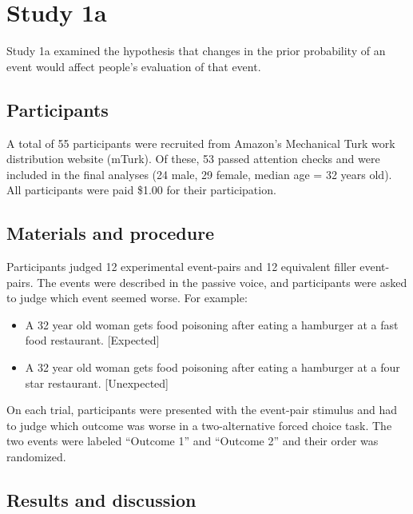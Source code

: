 \documentclass[10pt, letterpaper]{article}
\begin{document}
\section{Study 1a}\label{study-1a}

Study 1a examined the hypothesis that changes in the prior probability
of an event would affect people's evaluation of that event.

\subsection{Participants}\label{participants}

A total of 55 participants were recruited from Amazon's Mechanical Turk
work distribution website (mTurk). Of these, 53 passed attention checks
and were included in the final analyses (24 male, 29 female, median age
= 32 years old). All participants were paid \$1.00 for their
participation.

\subsection{Materials and procedure}\label{materials-and-procedure}

Participants judged 12 experimental event-pairs and 12 equivalent filler
event-pairs. The events were described in the passive voice, and
participants were asked to judge which event seemed worse. For example:

\begin{itemize}
\item
  A 32 year old woman gets food poisoning after eating a hamburger at a
  fast food restaurant. {[}Expected{]}
\item
  A 32 year old woman gets food poisoning after eating a hamburger at a
  four star restaurant. {[}Unexpected{]}
\end{itemize}

On each trial, participants were presented with the event-pair stimulus
and had to judge which outcome was worse in a two-alternative forced
choice task. The two events were labeled ``Outcome 1'' and ``Outcome 2''
and their order was randomized.

\subsection{Results and discussion}\label{results-and-discussion}
\end{document}
